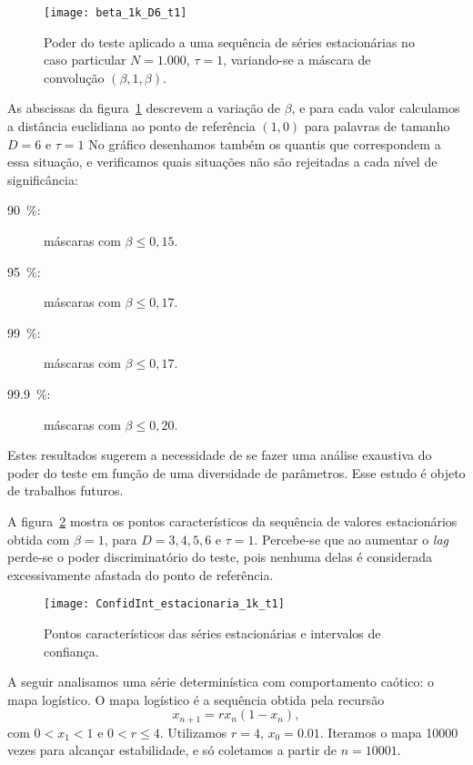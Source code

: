 \begin{figure}
	\centering
	\texttt{[image: beta\_1k\_D6\_t1]}
	\caption{Poder do teste aplicado a uma sequência de séries estacionárias no caso particular $N=1.000$, $\tau=1$, variando-se a máscara de convolução $(\beta,1,\beta)$.}\label{Fig:beta}
\end{figure}

As abscissas da figura~\ref{Fig:beta} descrevem a variação de $\beta$, e para cada valor calculamos a distância euclidiana ao ponto de referência $(1,0)$ para palavras de tamanho $D=6$ e $\tau=1$
No gráfico desenhamos também os quantis que correspondem a essa situação, e verificamos quais situações não são rejeitadas a cada nível de significância:
\begin{description}
\item[\SI{90}{\percent}:] máscaras com $\beta\leq 0,15$.
\item[\SI{95}{\percent}:] máscaras com $\beta\leq 0,17$.
\item[\SI{99}{\percent}:] máscaras com $\beta\leq 0,17$.
\item[\SI{99,9}{\percent}:] máscaras com $\beta\leq 0,20$.
\end{description}

Estes resultados sugerem a necessidade de se fazer uma análise exaustiva do poder do teste em função de uma diversidade de parâmetros.
Esse estudo é objeto de trabalhos futuros.

A figura~\ref{Fig:ConfidInt_estacionaria_1k_t1} mostra os pontos característicos da sequência de valores estacionários obtida com $\beta=1$, para $D=3,4,5,6$ e $\tau=1$.
Percebe-se que ao aumentar o \textit{lag} perde-se o poder discriminatório do teste, pois nenhuma delas é considerada excessivamente afastada do ponto de referência.

\begin{figure}
	\centering
	\texttt{[image: ConfidInt\_estacionaria\_1k\_t1]}
	\caption{Pontos característicos das séries estacionárias e intervalos de confiança.}\label{Fig:ConfidInt_estacionaria_1k_t1}
\end{figure}

A seguir analisamos uma série determinística com comportamento caótico: o mapa logístico.
O mapa logístico é a sequência obtida pela recursão
\begin{equation}
x_{n+1} = r x_n(1-x_n),
\end{equation}
com $0<x_1<1$ e $0<r\leq 4$.
Utilizamos $r=4$, $x_0=0.01$.
Iteramos o mapa \num{10000} vezes para alcançar estabilidade, e só coletamos a partir de $n=10001$.

